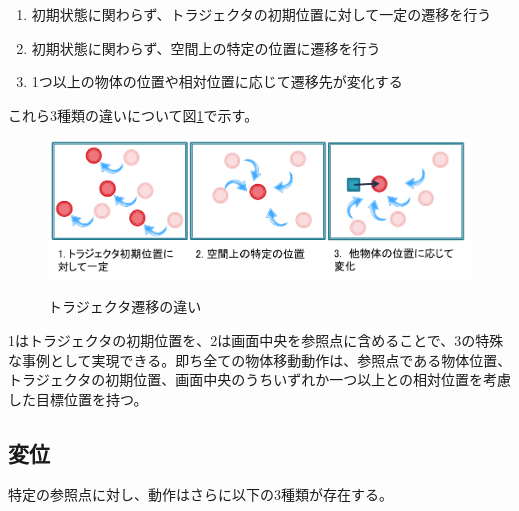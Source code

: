 	\begin{enumerate}
		\item 初期状態に関わらず、トラジェクタの初期位置に対して一定の遷移を行う
		\item 初期状態に関わらず、空間上の特定の位置に遷移を行う
		\item 1つ以上の物体の位置や相対位置に応じて遷移先が変化する
	\end{enumerate}
これら3種類の違いについて図\ref{figure:moving_trajector}で示す。
	\begin{figure}[h]
		\begin{center}
			\includegraphics[width=14cm]{figure1.png} \\ %
			\caption{トラジェクタ遷移の違い}
			\label{figure:moving_trajector}
		\end{center}
	\end{figure}
1はトラジェクタの初期位置を、2は画面中央を参照点に含めることで、3の特殊な事例として実現できる。即ち全ての物体移動動作は、参照点である物体位置、トラジェクタの初期位置、画面中央のうちいずれか一つ以上との相対位置を考慮した目標位置を持つ。

\subsection{変位}

特定の参照点に対し、動作はさらに以下の3種類が存在する。

